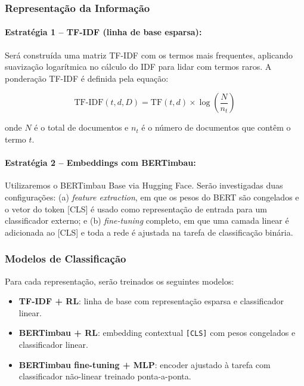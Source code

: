 \documentclass{IEEEtran}
\begin{document}
\subsubsection{Representação da Informação}
\label{subsubsec:representation}

\paragraph{Estratégia 1 -- TF-IDF (linha de base esparsa):}
Será construída uma matriz TF-IDF com os termos mais frequentes, aplicando suavização logarítmica no cálculo do IDF para lidar com termos raros. A ponderação TF-IDF é definida pela equação:

\begin{equation}
  \text{TF-IDF}(t,d,D) = \text{TF}(t,d) \times \log\!\left(\frac{N}{n_t}\right)
  \label{eq:tfidf}
\end{equation}

onde $N$ é o total de documentos e $n_t$ é o número de documentos que contêm o termo $t$.

\paragraph{Estratégia 2 -- Embeddings com BERTimbau:}
Utilizaremos o BERTimbau Base \cite{souza2020bertimbau} via Hugging Face. Serão investigadas duas configurações: (a) \textit{feature extraction}, em que os pesos do BERT são congelados e o vetor do token [CLS] é usado como representação de entrada para um classificador externo; e (b) \textit{fine-tuning} completo, em que uma camada linear é adicionada ao [CLS] e toda a rede é ajustada na tarefa de classificação binária.

\subsubsection{Modelos de Classificação}
\label{subsubsec:classifiers}

Para cada representação, serão treinados os seguintes modelos:

\begin{itemize}[noitemsep]
  \item \textbf{TF-IDF + RL}: linha de base com representação esparsa e classificador linear.
  \item \textbf{BERTimbau + RL}: embedding contextual \texttt{[CLS]} com pesos congelados e classificador linear.
  \item \textbf{BERTimbau fine-tuning + MLP}: encoder ajustado à tarefa com classificador não-linear treinado ponta-a-ponta.
\end{itemize}
\end{document}
